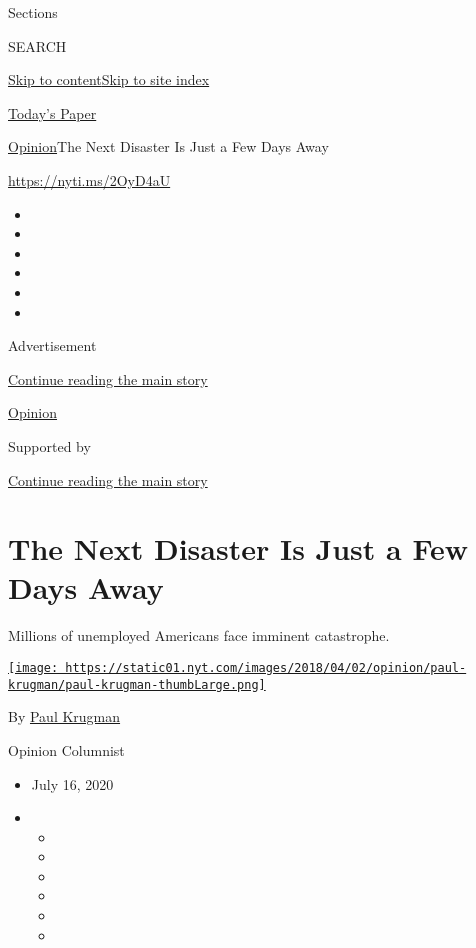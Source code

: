 Sections

SEARCH

\protect\hyperlink{site-content}{Skip to
content}\protect\hyperlink{site-index}{Skip to site index}

\href{https://myaccount.nytimes.com/auth/login?response_type=cookie\&client_id=vi}{}

\href{https://www.nytimes.com/section/todayspaper}{Today's Paper}

\href{/section/opinion}{Opinion}\textbar{}The Next Disaster Is Just a
Few Days Away

\href{https://nyti.ms/2OyD4aU}{https://nyti.ms/2OyD4aU}

\begin{itemize}
\item
\item
\item
\item
\item
\item
\end{itemize}

Advertisement

\protect\hyperlink{after-top}{Continue reading the main story}

\href{/section/opinion}{Opinion}

Supported by

\protect\hyperlink{after-sponsor}{Continue reading the main story}

\hypertarget{the-next-disaster-is-just-a-few-days-away}{%
\section{The Next Disaster Is Just a Few Days
Away}\label{the-next-disaster-is-just-a-few-days-away}}

Millions of unemployed Americans face imminent catastrophe.

\href{https://www.nytimes.com/by/paul-krugman}{\texttt{[image: https://static01.nyt.com/images/2018/04/02/opinion/paul-krugman/paul-krugman-thumbLarge.png]}}

By \href{https://www.nytimes.com/by/paul-krugman}{Paul Krugman}

Opinion Columnist

\begin{itemize}
\item
  July 16, 2020
\item
  \begin{itemize}
  \item
  \item
  \item
  \item
  \item
  \item
  \end{itemize}
\end{itemize}

